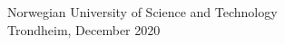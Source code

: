 \documentclass[../Main.tex]{subfiles}
\begin{document}
\vspace*{2\baselineskip}

\lipsum[4-5] %

\vspace*{3\baselineskip}

\center Norwegian University of Science and Technology\\

\center Trondheim, December 2020
\vspace*{3\baselineskip}


\makeatletter
\newcommand*{\textoverline}[1]{$\overline{\hbox{#1}}\m@th$}
\makeatother



\makebox[2.5in]{\hrulefill}  \qquad \qquad \qquad \makebox[2.5in]{\hrulefill}

 \qquad \qquad \qquad  {}
\end{document}
